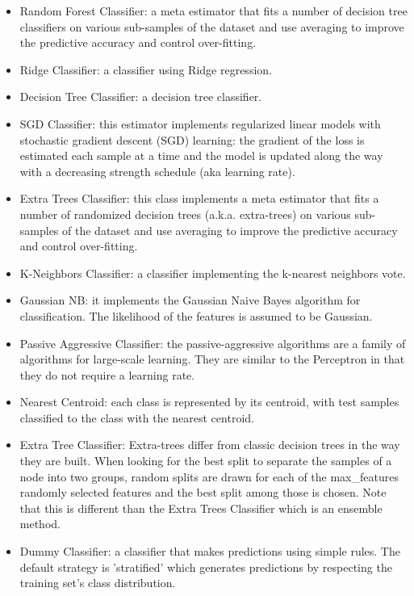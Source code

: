 \documentclass[a4paper]{article}
\begin{document}
\begin{itemize}
				\item Random Forest Classifier: a meta estimator that fits a number of decision tree classifiers on various sub-samples of the dataset and use averaging to improve the predictive accuracy and control over-fitting.
				
				\item Ridge Classifier: a classifier using Ridge regression.
				
				\item Decision Tree Classifier: a decision tree classifier.
				
				\item SGD Classifier: this estimator implements regularized linear models with stochastic gradient descent (SGD) learning: the gradient of the loss is estimated each sample at a time and the model is updated along the way with a decreasing strength schedule (aka learning rate). 
				
				\item Extra Trees Classifier: this class implements a meta estimator that fits a number of randomized decision trees (a.k.a. extra-trees) on various sub-samples of the dataset and use averaging to improve the predictive accuracy and control over-fitting.
				
				\item K-Neighbors Classifier: a classifier implementing the k-nearest neighbors vote.
				
				\item Gaussian NB: it implements the Gaussian Naive Bayes algorithm for classification. The likelihood of the features is assumed to be Gaussian.
				
				\item Passive Aggressive Classifier: the passive-aggressive algorithms are a family of algorithms for large-scale learning. They are similar to the Perceptron in that they do not require a learning rate. 
				
				\item Nearest Centroid: each class is represented by its centroid, with test samples classified to the class with the nearest centroid.
				
				\item Extra Tree Classifier: Extra-trees differ from classic decision trees in the way they are built. When looking for the best split to separate the samples of a node into two groups, random splits are drawn for each of the max\_features randomly selected features and the best split among those is chosen. Note that this is different than the Extra Trees Classifier which is an ensemble method.
				
				\item Dummy Classifier: a classifier that makes predictions using simple rules. The default strategy is 'stratified' which generates predictions by respecting the training set’s class distribution.
			\end{itemize}
			
\end{document}
